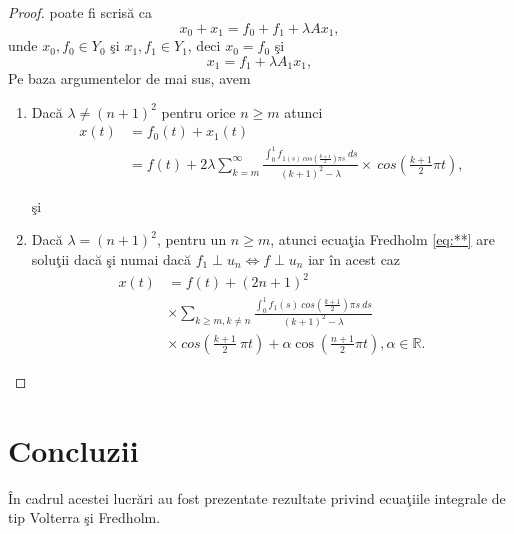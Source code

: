 \documentclass[a4paper,12pt,oneside]{report}
\begin{document}
\begin{proof}
\noindent poate fi scris\u{a} ca
\begin{displaymath}
  x_{0} + x_{1} = f_{0} + f_{1} + \lambda Ax_{1},
\end{displaymath}
unde \(x_{0} ,f_{0} \in Y_{0}\) \c{s}i \(x_{1} ,f_{1} \in Y_{1}\), deci \(x_{0} = f_{0}\)  \c{s}i
\begin{displaymath}
  x_{1} = f_{1} + \lambda A_{1}x_{1}, \label{eq:**} \tag{**}
\end{displaymath}
Pe baza argumentelor de mai sus, avem
\begin{enumerate}
    \item Dac\u{a} \(\lambda \neq \left ( n+1 \right )^{2}\) pentru orice \(n\geq m\) atunci
\begin{equation} \nonumber
    \begin{split}
       x\left ( t \right ) &   = f_{0}\left ( t \right ) + x_{1}\left ( t \right )  \\ &
        = f\left ( t \right ) + 2 \lambda \sum_{k=m}^{\infty }\frac{\int_{0}^{1}f_{1\left ( s \right ) \ cos\left ( \frac{k+1}{2} \right )\pi s }\ ds}{\left ( k+1 \right )^{2} - \lambda }\times \ cos \left ( \frac{k+1}{2}\pi t \right ),
    \end{split}
\end{equation}

 \c{s}i
 \item Dac\u{a} \(\lambda = \left ( n+1 \right )^{2}\), pentru un \(n\geq m\), atunci ecua\c{t}ia Fredholm \ref{eq:**} are solu\c{t}ii dac\u{a} \c{s}i numai dac\u{a} \(f_{1} \perp u_{n} \Leftrightarrow f \perp u_{n}\) iar \^{i}n acest caz
 \begin{equation} \nonumber
     \begin{split}
         x\left ( t \right ) &    = f\left ( t \right ) + \left ( 2n+1 \right )^{2} \\ &
         \times \sum_{k\geq m,k\neq n}\frac{\int_{0}^{1}f_{1}\left ( s \right ) \ cos \left ( \frac{k+1}{2} \right ) \pi s \ ds}{\left ( k+1 \right )^{2} - \lambda } \\ &
          \times  \ cos \left ( \frac{k+1}{2}\ \pi t  \right ) + \alpha  \cos \left ( \frac{n+1}{2} \pi t \right ), \alpha \in \mathbb{R}.
     \end{split}
 \end{equation}


\end{enumerate}

\end{proof}
\chapter* {Concluzii}
\^{I}n cadrul acestei lucr\u{a}ri au fost prezentate rezultate privind ecua\c{t}iile integrale de tip Volterra \c{s}i Fredholm.
\end{document}
